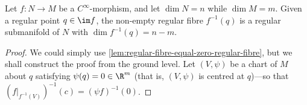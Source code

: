 \begin{theorem}
\label{thm:regular-fibre-theorem}
Let \(f: N \to M\) be a \(C^{\infty}\)-morphism, and let \(\dim N = n\) while
\(\dim M = m\). Given a regular point \(q \in \im f\), the non-empty regular
fibre \(f^{-1}(q)\) is a regular submanifold of \(N\) with
\(\dim f^{-1}(q) = n - m\).
\end{theorem}

\begin{proof}
We could simply use \cref{lem:regular-fibre-equal-zero-regular-fibre}, but we
shall construct the proof from the ground level. Let \((V, \psi)\) be a chart of
\(M\) about \(q\) satisfying \(\psi(q) = 0 \in \R^m\) (that is, \((V, \psi)\) is
centred at \(q\))---so that \((f|_{f^{-1}(V)})^{-1}(c) = (\psi f)^{-1}(0)\).
\end{proof}


